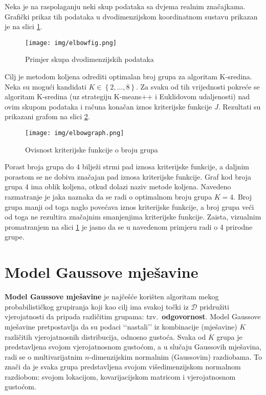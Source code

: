 \documentclass[times, utf8, zavrsni]{fer}
\begin{document}
Neka je na raspolaganju neki skup podataka sa dvjema realnim značajkama. Grafički prikaz tih podataka u dvodimenzijskom koordinatnom sustavu prikazan je na slici \ref{fig:elbowdata}.
\begin{figure}[H]
    \centering
    \texttt{[image: img/elbowfig.png]}
    \caption{Primjer skupa dvodimenzijskih podataka}
    \label{fig:elbowdata}
\end{figure} Cilj je metodom koljena odrediti optimalan broj grupa za algoritam K-sredina. Neka su mogući kandidati $K \in \left\{2, \dots, 8\right\}$. Za svaku od tih vrijednosti pokreće se algoritam K-sredina (uz strategiju K-means++ i Euklidovom udaljenosti) nad ovim skupom podataka i računa konačan iznos kriterijske funkcije $J$. Rezultati su prikazani grafom na slici \ref{fig:elbowgraph}.
\begin{figure}[H]
    \centering
    \texttt{[image: img/elbowgraph.png]}
    \caption{Ovisnost kriterijske funkcije o broju grupa}
    \label{fig:elbowgraph}
\end{figure}
Porast broja grupa do 4 bilježi strmi pad iznosa kriterijske funkcije, a daljnim porastom se ne dobiva značajan pad iznosa kriterijske funkcije. Graf kod broja grupa 4 ima oblik koljena, otkud dolazi naziv metode koljena. Navedeno razmatranje je jaka naznaka da se radi o optimalnom broju grupa $K = 4$. Broj grupa manji od toga naglo povećava iznos kriterijske funkcije, a broj grupa veći od toga ne rezultira značajnim smanjenjima kriterijske funkcije. Zaista, vizualnim promatranjem na slici \ref{fig:elbowdata} je jasno da se u navedenom primjeru radi o 4 prirodne grupe.


\section{Model Gaussove mješavine}
\label{gmm}
\textbf{Model Gaussove mješavine}  je najčešće korišten algoritam mekog probabilističkog grupiranja koji kao cilj ima svakoj točki iz $\mathcal{D}$ pridružiti vjerojatnosti da pripada različitim grupama: tzv.\ \textbf{odgovornost}. Model Gaussove mješavine pretpostavlja da su podaci ‘‘nastali’’ iz kombinacije (mješavine) $K$ različitih vjerojatnosnih distribucija, odnosno gustoća. Svaka od $K$ grupa je predstavljena svojom vjerojatnosnom gustoćom, a u slučaju Gaussovih mješavina, radi se o multivarijatnim $n$-dimenzijskim normalnim (Gaussovim) razdiobama. To znači da je svaka grupa predstavljena svojom višedimenzijskom normalnom razdiobom: svojom lokacijom, kovarijacijskom matricom i vjerojatnosnom gustoćom.
\end{document}

